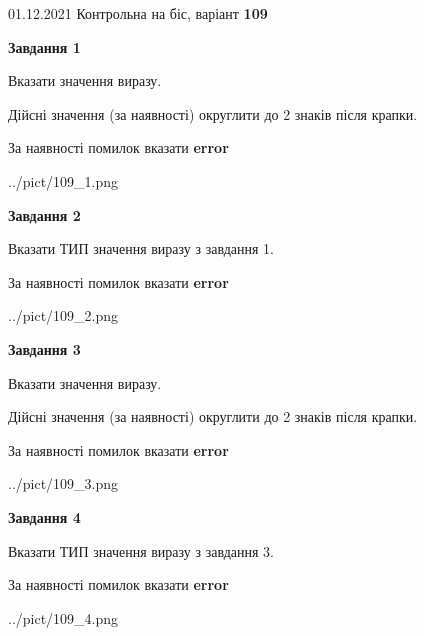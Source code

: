 \documentclass[11pt, ukrainian]{article}
\begin{document}
{01.12.2021 Контрольна на біс, варіант  \No \textbf { 109 }\par}
{
\begin {large}
{\begin {center}\textbf{Завдання 1}\end {center}}\par
Вказати значення виразу. \par
Дійсні значення (за наявності) округлити до 2 знаків після крапки. \par
За наявності помилок вказати \textbf{error}

\begin{center}
	{../pict/109_1.png}
\end{center}
\newpage

{\begin {center}\textbf{Завдання 2}\end {center}}\par
Вказати ТИП значення виразу з завдання 1. \par
За наявності помилок вказати \textbf{error}

\begin{center}
	{../pict/109_2.png}
\end{center}
\newpage

{\begin {center}\textbf{Завдання 3}\end {center}}\par
Вказати значення виразу. \par
Дійсні значення (за наявності) округлити до 2 знаків після крапки. \par
За наявності помилок вказати \textbf{error}

\begin{center}
	{../pict/109_3.png}
\end{center}
\newpage

{\begin {center}\textbf{Завдання 4}\end {center}}\par
Вказати ТИП значення виразу з завдання 3. \par
За наявності помилок вказати \textbf{error}

\begin{center}
	{../pict/109_4.png}
\end{center}
\newpage


\end{large}}
\end{document}
